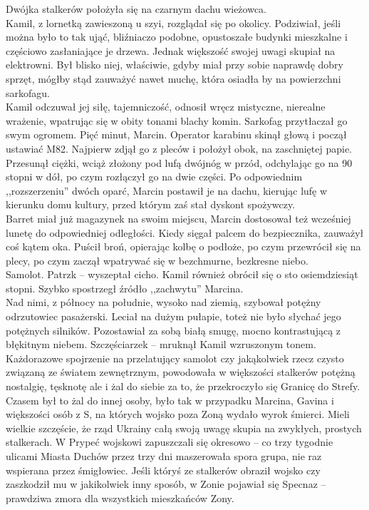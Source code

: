 \documentclass[../MAIN.tex]{subfiles}
\begin{document}
Dwójka stalkerów położyła się na czarnym dachu wieżowca.\\
Kamil, z lornetką zawieszoną u szyi, rozglądał się po okolicy. Podziwiał, jeśli można było to tak ująć, bliźniaczo podobne, opustoszałe budynki mieszkalne i częściowo zasłaniające je drzewa. Jednak większość swojej uwagi skupiał na elektrowni. Był blisko niej, właściwie, gdyby miał przy sobie naprawdę dobry sprzęt, mógłby stąd zauważyć nawet muchę, która osiadła by na powierzchni sarkofagu.\\
Kamil odczuwał jej siłę, tajemniczość, odnosił wręcz mistyczne, nierealne wrażenie, wpatrując się w obity tonami blachy komin. Sarkofag przytłaczał go swym ogromem.
\sx Pięć minut, Marcin.
\qd
Operator karabinu skinął głową i począł ustawiać M82. Najpierw zdjął go z pleców i położył obok, na zaschniętej papie. Przesunął ciężki, wciąż złożony pod lufą dwójnóg w przód, odchylając go na 90 stopni w dół, po czym rozłączył go na dwie części. Po odpowiednim ,,rozszerzeniu'' dwóch oparć, Marcin postawił je na dachu, kierując lufę w kierunku domu kultury, przed którym zaś stał dyskont spożywczy.\\
Barret miał już magazynek na swoim miejscu, Marcin dostosował też wcześniej lunetę do odpowiedniej odległości. Kiedy sięgał palcem do bezpiecznika, zauważył coś kątem oka. Puścił broń, opierając kolbę o podłoże, po czym przewrócił się na plecy, po czym zaczął wpatrywać się w bezchmurne, bezkresne niebo.\\
Samolot.
\sx Patrz\3k -- wyszeptał cicho.
\qd
Kamil również obrócił się o sto osiemdziesiąt stopni. Szybko spostrzegł źródło ,,zachwytu'' Marcina.\\
Nad nimi, z północy na południe, wysoko nad ziemią, szybował potężny odrzutowiec pasażerski. Leciał na dużym pułapie, toteż nie było słychać jego potężnych silników. Pozostawiał za sobą białą smugę, mocno kontrastującą z błękitnym niebem.
\sx Szczęściarze\3k -- mruknął Kamil wzruszonym tonem. 
\qd
Każdorazowe spojrzenie na przelatujący samolot czy jakąkolwiek rzecz czysto związaną ze światem zewnętrznym, powodowała w większości stalkerów potężną nostalgię, tęsknotę ale i żal do siebie za to, że przekroczyło się Granicę do Strefy. Czasem był to żal do innej osoby, było tak w przypadku Marcina, Gavina i większości osób z S, na których wojsko poza Zoną wydało wyrok śmierci. Mieli wielkie szczęście, że rząd Ukrainy całą swoją uwagę skupia na zwykłych, prostych stalkerach. W Prypeć wojskowi zapuszczali się okresowo -- co trzy tygodnie ulicami Miasta Duchów przez trzy dni maszerowała spora grupa, nie raz wspierana przez śmigłowiec. Jeśli któryś ze stalkerów obraził wojsko czy zaszkodził mu w jakikolwiek inny sposób, w Zonie pojawiał się Specnaz -- prawdziwa zmora dla wszystkich mieszkańców Zony.
\end{document}

